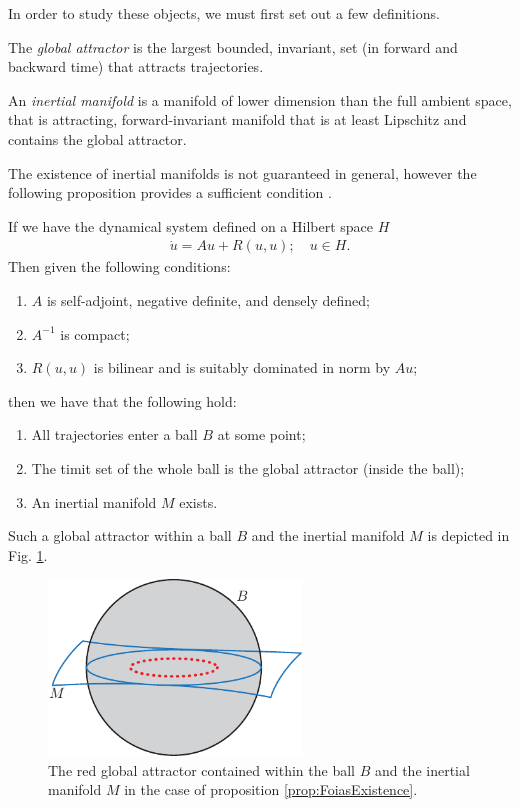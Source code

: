 In order to study these objects, we must first set out a few definitions.
\begin{definition}
	The \emph{global attractor} is the largest bounded, invariant, set (in forward and backward time) that attracts trajectories.
\end{definition}
\begin{definition}
An \emph{inertial manifold} is a manifold of lower dimension than the full ambient space, that is attracting, forward-invariant manifold that is at least Lipschitz and contains the global attractor.
\end{definition}

The existence of inertial manifolds is not guaranteed in general, however the following proposition provides a sufficient condition \cite{FoiasInertial}.
\begin{proposition}[] \label{prop:FoiasExistence}
	If we have the dynamical system defined on a Hilbert space $H$
	\begin{align}
		\dot{u} = Au + R(u,u);\quad u\in H.
	\end{align}
Then given the following conditions:
\begin{enumerate}
	\item $A$ is self-adjoint, negative definite, and densely defined;
	\item $A^{-1}$ is compact;
	\item $R(u,u)$ is bilinear and is suitably dominated in norm by $Au$;
\end{enumerate}
then we have that the following hold:
\begin{enumerate}
	\item All trajectories enter a ball $B$ at some point;
	\item The timit set of the whole ball is the global attractor (inside the ball);
	\item An inertial manifold $M$ exists.
\end{enumerate}
Such a global attractor within a ball $B$ and the inertial manifold $M$ is depicted in Fig. \ref{fig:FoiaProp}.
\end{proposition}
\begin{figure}[h!]
	\centering
	\includegraphics[width=0.6\textwidth]{figures/ch9/28FoiaProp.pdf}
	\caption{The red global attractor contained within the ball $B$ and the inertial manifold $M$ in the case of proposition \ref{prop:FoiasExistence}.}
	\label{fig:FoiaProp}
\end{figure}

